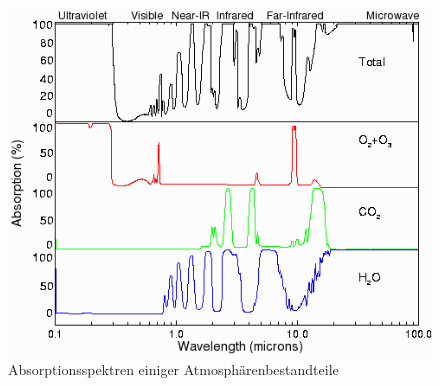 \documentclass[]{article}
\begin{document}
		\begin{figure}[!h]
			\centering
			\includegraphics[scale=0.5]{images/Absorptionsspektrum}
			\caption{Absorptionsspektren einiger Atmosphärenbestandteile\cite{atmosphaere}}
			\label{img:absorptionsspektrum}
		\end{figure}
		\newpage
\end{document}
